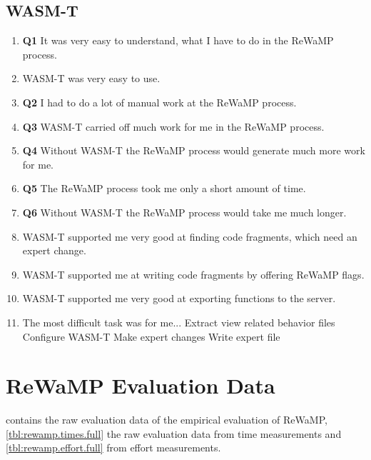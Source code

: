 \begin{appendix}
\subsection*{WASM-T}\vspace{-2pt}
\begin{enumerate}
\item\textbf{Q1} It was very easy to understand, what I have to do in the ReWaMP process.
\item WASM-T was very easy to use.
\item\textbf{Q2} I had to do a lot of manual work at the ReWaMP process.
\item\textbf{Q3} WASM-T carried off much work for me in the ReWaMP process.
\item\textbf{Q4} Without WASM-T the ReWaMP process would generate much more work for me.
\item\textbf{Q5} The ReWaMP process took me only a short amount of time.
\item\textbf{Q6} Without WASM-T the ReWaMP process would take me much longer.
\item WASM-T supported me very good at finding code fragments, which need an expert change.
\item WASM-T supported me at writing code fragments by offering ReWaMP flags.
\item WASM-T supported me very good at exporting functions to the server.
\item The most difficult task was for me...
\subitem Extract view related behavior files
\subitem Configure WASM-T
\subitem Make expert changes
\subitem Write expert file
\end{enumerate}

\vspace{-15pt}
\section{ReWaMP Evaluation Data}
\vspace{15pt}

 contains the raw evaluation data of the empirical evaluation of ReWaMP, \cref{tbl:rewamp.times.full} the raw evaluation data from time measurements and \cref{tbl:rewamp.effort.full} from effort measurements.


\end{appendix}

